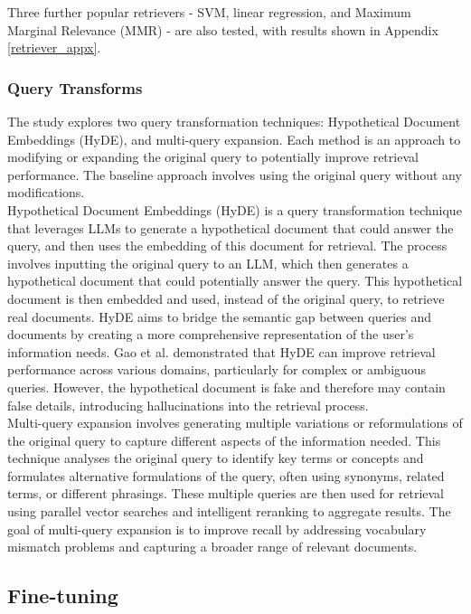 Three further popular retrievers - SVM, linear regression, and Maximum Marginal Relevance (MMR) - are also tested, with results shown in Appendix \ref{retriever_appx}. 
 

\subsubsection{Query Transforms}


The study explores two query transformation techniques: Hypothetical Document Embeddings (HyDE), and multi-query expansion. Each method is an approach to modifying or expanding the original query to potentially improve retrieval performance. The baseline approach involves using the original query without any modifications. \\

Hypothetical Document Embeddings (HyDE) \cite{gao2022precise} is a query transformation technique that leverages LLMs to generate a hypothetical document that could answer the query, and then uses the embedding of this document for retrieval. The process involves inputting the original query to an LLM, which then generates a hypothetical document that could potentially answer the query. This hypothetical document is then embedded and used, instead of the original query, to retrieve real documents. HyDE aims to bridge the semantic gap between queries and documents by creating a more comprehensive representation of the user's information needs. Gao et al. \cite{gao2022precise} demonstrated that HyDE can improve retrieval performance across various domains, particularly for complex or ambiguous queries. However, the hypothetical document is fake and therefore may contain false details, introducing hallucinations into the retrieval process. \\

Multi-query expansion \cite{medium_rag_not_working} involves generating multiple variations or reformulations of the original query to capture different aspects of the information needed. This technique analyses the original query to identify key terms or concepts and formulates alternative formulations of the query, often using synonyms, related terms, or different phrasings. These multiple queries are then used for retrieval using parallel vector searches and intelligent reranking to aggregate results. The goal of multi-query expansion is to improve recall by addressing vocabulary mismatch problems and capturing a broader range of relevant documents.


\subsection{Fine-tuning}\label{finetuning}

